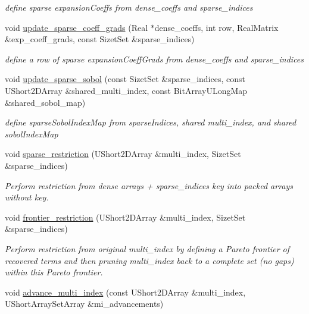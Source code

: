 \begin{DoxyCompactItemize}
\begin{DoxyCompactList}\small\item\em define sparse expansion\+Coeffs from dense\+\_\+coeffs and sparse\+\_\+indices \end{DoxyCompactList}\item 
void \hyperlink{classPecos_1_1RegressOrthogPolyApproximation_a14f0eeac7f1af2bd9357a56b9661e49e}{update\+\_\+sparse\+\_\+coeff\+\_\+grads} (Real $\ast$dense\+\_\+coeffs, int row, Real\+Matrix \&exp\+\_\+coeff\+\_\+grads, const Sizet\+Set \&sparse\+\_\+indices)\label{classPecos_1_1RegressOrthogPolyApproximation_a14f0eeac7f1af2bd9357a56b9661e49e}

\begin{DoxyCompactList}\small\item\em define a row of sparse expansion\+Coeff\+Grads from dense\+\_\+coeffs and sparse\+\_\+indices \end{DoxyCompactList}\item 
void \hyperlink{classPecos_1_1RegressOrthogPolyApproximation_a512bafb19f7612dd5f44215d79148899}{update\+\_\+sparse\+\_\+sobol} (const Sizet\+Set \&sparse\+\_\+indices, const U\+Short2\+D\+Array \&shared\+\_\+multi\+\_\+index, const Bit\+Array\+U\+Long\+Map \&shared\+\_\+sobol\+\_\+map)\label{classPecos_1_1RegressOrthogPolyApproximation_a512bafb19f7612dd5f44215d79148899}

\begin{DoxyCompactList}\small\item\em define sparse\+Sobol\+Index\+Map from sparse\+Indices, shared multi\+\_\+index, and shared sobol\+Index\+Map \end{DoxyCompactList}\item 
void \hyperlink{classPecos_1_1RegressOrthogPolyApproximation_a782c0c088bb005a5b609e221d7230974}{sparse\+\_\+restriction} (U\+Short2\+D\+Array \&multi\+\_\+index, Sizet\+Set \&sparse\+\_\+indices)
\begin{DoxyCompactList}\small\item\em Perform restriction from dense arrays + sparse\+\_\+indices key into packed arrays without key. \end{DoxyCompactList}\item 
void \hyperlink{classPecos_1_1RegressOrthogPolyApproximation_a30bb17a6ca9a1d97fa4363c05a0f64f2}{frontier\+\_\+restriction} (U\+Short2\+D\+Array \&multi\+\_\+index, Sizet\+Set \&sparse\+\_\+indices)
\begin{DoxyCompactList}\small\item\em Perform restriction from original multi\+\_\+index by defining a Pareto frontier of recovered terms and then pruning multi\+\_\+index back to a complete set (no gaps) within this Pareto frontier. \end{DoxyCompactList}\item 
void \hyperlink{classPecos_1_1RegressOrthogPolyApproximation_a85039f6b94d998746b027e2b37451725}{advance\+\_\+multi\+\_\+index} (const U\+Short2\+D\+Array \&multi\+\_\+index, U\+Short\+Array\+Set\+Array \&mi\+\_\+advancements)\label{classPecos_1_1RegressOrthogPolyApproximation_a85039f6b94d998746b027e2b37451725}


\end{DoxyCompactItemize}
